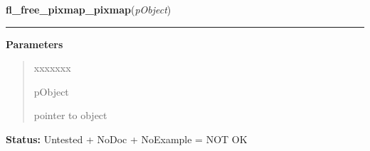 \hspace{.8\funcindent}\begin{boxedminipage}{\funcwidth}

    \raggedright \textbf{fl\_free\_pixmap\_pixmap}(\textit{pObject})

    \vspace{-1.5ex}

    \rule{\textwidth}{0.5\fboxrule}
\setlength{\parskip}{2ex}
\setlength{\parskip}{1ex}
      \textbf{Parameters}
      \vspace{-1ex}

      \begin{quote}
        \begin{Ventry}{xxxxxxx}

          \item[pObject]

          pointer to object

        \end{Ventry}

      \end{quote}

\textbf{Status:} Untested + NoDoc + NoExample = NOT OK



    \end{boxedminipage}

    \label{xformslib:library:fl_get_pixmap_pixmap}

    \vspace{0.5ex}

